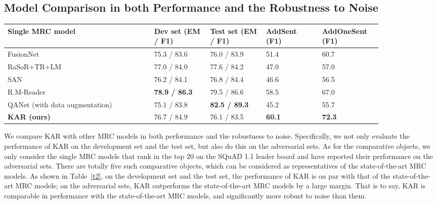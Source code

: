 \documentclass[11pt,a4paper]{article}
\begin{document}
\subsection{Model Comparison in both Performance and the Robustness to Noise}
\begin{table*}
\centering
\begin{tabular}
{|m{0.34\linewidth}|m{0.13\linewidth}|m{0.13\linewidth}|m{0.13\linewidth}|m{0.13\linewidth}|}
\hline
\textbf{Single MRC model} &
\textbf{Dev set \newline (EM / F1)} &
\textbf{Test set \newline (EM / F1)} &
\textbf{AddSent \newline (F1)} &
\textbf{AddOneSent \newline (F1)} \\
\hline
FusionNet \cite{huanghsinyuan:2017} & 75.3 / 83.6 & 76.0 / 83.9 & 51.4 & 60.7 \\
\hline
RaSoR+TR+LM \cite{salantshimi:2017} & 77.0 / 84.0 & 77.6 / 84.2 & 47.0 & 57.0 \\
\hline
SAN \cite{liuxiaodong:2017} & 76.2 / 84.1 & 76.8 / 84.4 & 46.6 & 56.5 \\
\hline
R.M-Reader \cite{huminghao:2017} & \textbf{78.9 / 86.3} & 79.5 / 86.6 & 58.5 & 67.0 \\
\hline
QANet (with data augmentation) \cite{yuadamswei:2018} & 75.1 / 83.8 & \textbf{82.5 / 89.3} & 45.2 & 55.7 \\
\hline
\textbf{KAR (ours)} & 76.7 / 84.9 & 76.1 / 83.5 & \textbf{60.1} & \textbf{72.3} \\
\hline
\end{tabular}
\caption{\label{t2} Model comparison based on SQuAD 1.1 and two of its adversarial sets: AddSent and AddOneSent. All the numbers are up to date as of October 18, 2018. Note that SQuAD 2.0 \cite{rajpurkarpranav:2018} is not involved in this paper, because it requires MRC models to deal with the problem of answer triggering, but this paper is aimed at improving the hunger for data and robustness to noise of MRC models.}
\end{table*}
We compare KAR with other MRC models in both performance and the robustness to noise. Specifically, we not only evaluate the performance of KAR on the development set and the test set, but also do this on the adversarial sets. As for the comparative objects, we only consider the single MRC models that rank in the top 20 on the SQuAD 1.1 leader board and have reported their performance on the adversarial sets. There are totally five such comparative objects, which can be considered as representatives of the state-of-the-art MRC models. As shown in Table~\ref{t2}, on the development set and the test set, the performance of KAR is on par with that of the state-of-the-art MRC models; on the adversarial sets, KAR outperforms the state-of-the-art MRC models by a large margin. That is to say, KAR is comparable in performance with the state-of-the-art MRC models, and significantly more robust to noise than them. \\
\end{document}
